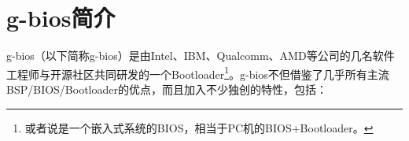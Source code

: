 \section{g-bios简介}

g-bios（以下简称g-bios）是由Intel、IBM、Qualcomm、AMD等公司的几名软件工程师与开源社区共同研发的一个Bootloader\footnote{或者说是一个嵌入式系统的BIOS，相当于PC机的BIOS+Bootloader。}。g-bios不但借鉴了几乎所有主流BSP/BIOS/Bootloader的优点，而且加入不少独创的特性，包括：
